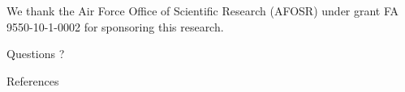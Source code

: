 \documentclass{beamer}
\begin{document}
\begin{frame}
We thank the Air Force Office of Scientific Research (AFOSR) under grant FA 9550-10-1-0002 for sponsoring this research.
\end{frame}


\begin{frame}
Questions
?
\end{frame}


\begin{frame}{References}
\fontsize{8pt}{8pt}


  
\end{frame}
\end{document}
